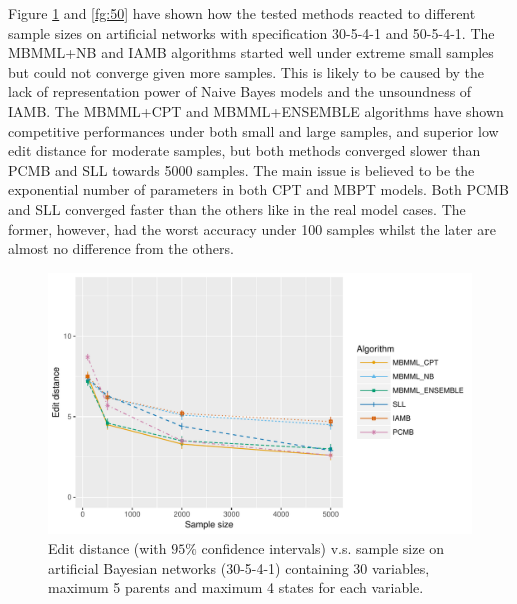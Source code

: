 Figure \ref{fg:30} and \ref{fg:50} have shown how the tested methods reacted to different sample sizes on artificial networks with specification 30-5-4-1 and 50-5-4-1. The MBMML+NB and IAMB algorithms started well under extreme small samples but could not converge given more samples. This is likely to be caused by the lack of representation power of Naive Bayes models and the unsoundness of IAMB. The MBMML+CPT and MBMML+ENSEMBLE algorithms have shown competitive performances under both small and large samples, and superior low edit distance for moderate samples, but both methods converged slower than PCMB and SLL towards 5000 samples. The main issue is believed to be the exponential number of parameters in both CPT and MBPT models. Both PCMB and SLL converged faster than the others like in the real model cases. The former, however, had the worst accuracy under 100 samples whilst the later are  almost no difference from the others. 
\begin{figure}[H]
  \centering
    \includegraphics[scale=0.6]{figures/ed_vs_samplesize_30_5_4_1.pdf}
  \caption{Edit distance (with $95\%$ confidence intervals) v.s. sample size on artificial Bayesian networks (30-5-4-1) containing 30 variables, maximum 5 parents and maximum 4 states for each variable.}
  \label{fg:30}
\end{figure}

